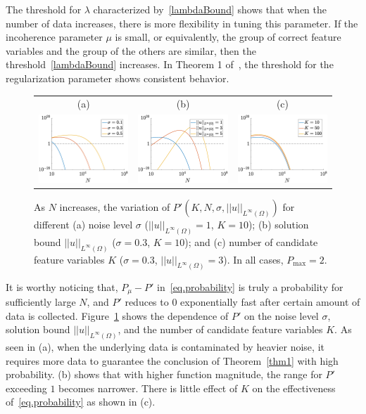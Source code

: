 \documentclass[a4paper,11pt]{article}
\begin{document}
The threshold for $\lambda$ characterized by~\eqref{lambdaBound} shows that when the number of data increases, there is more flexibility in tuning this parameter. If the incoherence parameter $\mu$ is small, or equivalently, the group of correct feature variables and the group of the others are similar, then the threshold~\eqref{lambdaBound} increases. In Theorem 1 of~\cite{wainwright2009sharp}, the threshold for the regularization parameter shows consistent behavior. 
\begin{figure}
\centering
\begin{tabular}{ccc}
(a)&(b)&(c)\\
\includegraphics[width=2in]{Figures/prob1.eps}&	
\includegraphics[width=2in]{Figures/prob2.eps}&
\includegraphics[width=2in]{Figures/prob3.eps}
\end{tabular}
\caption{As $N$ increases, the variation of $P'(K,N,\sigma,||u||_{L^\infty(\Omega)})$ for different (a) noise level $\sigma$ ($||u||_{L^\infty(\Omega)}=1$, $K=10$); (b) solution bound $||u||_{L^\infty(\Omega)}$ ($\sigma=0.3$, $K=10$); and (c) number of candidate feature variables $K$ ($\sigma=0.3$, $||u||_{L^\infty(\Omega)}=3$). In all cases, $P_{\max}=2$.}\label{fig.probstudy}
\end{figure}

It is worthy noticing that, $P_\mu-P'$ in~\eqref{eq.probability} is truly a probability for sufficiently large $N$, and $P'$ reduces to $0$ exponentially fast after certain amount of data is collected. Figure~\ref{fig.probstudy} shows the dependence of $P'$ on the noise level $\sigma$, solution bound $||u||_{L^\infty(\Omega)}$, and the number of candidate feature variables $K$. As seen in (a), when the underlying data is contaminated by heavier noise, it requires more data to guarantee the conclusion of Theorem~\ref{thm1} with high probability. (b) shows that with higher function magnitude, the range for $P'$ exceeding $1$ becomes narrower. There is little effect of $K$ on the effectiveness of~\eqref{eq.probability} as shown in (c).
\end{document}

